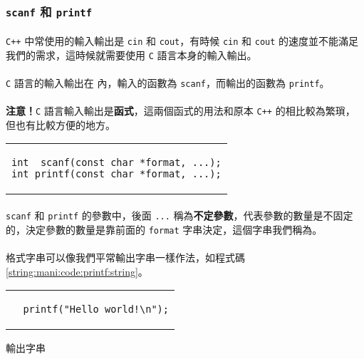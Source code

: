 \documentclass[12pt,a4paper,oneside]{report}
\begin{document}
\begin{CJK}{UTF8}{bkai}
\subsubsection{\lstinline!scanf! 和 \lstinline!printf!}

\paragraph{}\texttt{C++} 中常使用的輸入輸出是 \lstinline!cin! 和 \lstinline!cout!，有時候 \lstinline!cin! 和 \lstinline!cout! 的速度並不能滿足我們的需求，這時候就需要使用 \texttt{C} 語言本身的輸入輸出。
\paragraph{}\texttt{C} 語言的輸入輸出在  內，輸入的函數為 \lstinline!scanf!，而輸出的函數為 \lstinline!printf!。
\paragraph{}{\color{red}\textbf{注意！}}\texttt{C} 語言輸入輸出是\textbf{函式}，這兩個函式的用法和原本 \texttt{C++} 的相比較為繁瑣，但也有比較方便的地方。

\begin{code}[h!]
  \centering
  \begin{tabular}{c}
  \begin{lstlisting}
int  scanf(const char *format, ...);
int printf(const char *format, ...);
  \end{lstlisting}
  \end{tabular}
  \caption{\lstinline!scanf! 和 \lstinline!printf!}
  \label{string:mani:code:scanf:and:printf}
\end{code}

\paragraph{}\lstinline!scanf! 和 \lstinline!printf! 的參數中，後面 \lstinline!...! 稱為\textbf{不定參數}，代表參數的數量是不固定的，決定參數的數量是靠前面的 \lstinline!format! 字串決定，這個字串我們稱為。
\paragraph{}格式字串可以像我們平常輸出字串一樣作法，如程式碼 \ref{string:mani:code:printf:string}。

\begin{code}[h!]
  \centering
  \begin{tabular}{c}
  \begin{lstlisting}
  printf("Hello world!\n");
  \end{lstlisting}
  \end{tabular}
  \caption{輸出字串}
  \label{string:mani:code:printf:string}
\end{code}


\end{CJK}
\end{document}
